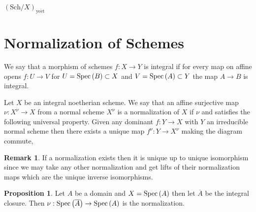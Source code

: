 \documentclass[12pt]{extarticle}
\theoremstyle{definition}
\newtheorem{proposition}[theorem]{Proposition}
\newtheorem{remark}{Remark}
\newenvironment{definition}[1][Definition:]{\begin{trivlist}
\item[\hskip \labelsep {\bfseries #1}]}{\end{trivlist}}
\begin{document}
\( (\mathrm{Sch} / X)_{\mathrm{ye\acute{e}t}} \)

\section{Normalization of Schemes}

\begin{definition}
We say that a morphism of schemes $f : X \to Y$ is integral if for every map on affine opens $f : U \to V$ for $U = \mathrm{Spec}\left(B\right) \subset X$ and $V = \mathrm{Spec}\left(A\right) \subset Y$ the map $A \to B$ is integral. 
\end{definition}

\begin{definition}
Let $X$ be an integral noetherian scheme. We say that an affine surjective map $\nu : X^\nu \to X$ from a normal scheme $X^\nu$ is a normalization of $X$ if $\nu$  and satisfies the following universal property. Given any dominant $f : Y \to X$ with $Y$ an irreducible normal scheme then there exists a unique map $f^\nu : Y \to X^\nu$ making the diagram commute,
\begin{center}
\end{center}
\end{definition}

\begin{remark}
If a normalization exists then it is unique up to unique isomorphism since we may take any other normalization and get lifts of their normalization maps which are the unique inverse isomorphisms. 
\end{remark}

\begin{proposition}
Let $A$ be a domain and $X = \mathrm{Spec}\left(A\right)$ then let $\overline{A}$ be the integral closure. Then $\nu : \mathrm{Spec}\left(\overline{A}\right) \to \mathrm{Spec}\left(A\right)$ is the normalization. 
\end{proposition}
\end{document}
